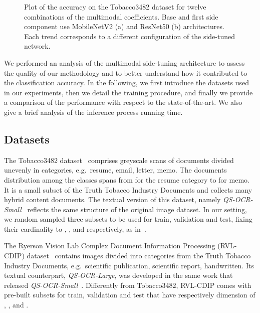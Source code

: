 

\begin{figure*}[ht]\centering
{}\qquad
{}
\caption{Plot of the accuracy on the Tobacco3482 dataset for twelve combinations of the multimodal coefficients. Base and first side component use MobileNetV2 (a) and ResNet50 (b) architectures. Each trend corresponds to a different configuration of the side-tuned network.}\label{fig:exp_coefficients}\end{figure*}



We performed an analysis of the multimodal side-tuning architecture to assess the quality of our methodology and to better understand how it contributed to the classification accuracy.
In the following, we first introduce the datasets used in our experiments, then we detail the training procedure, and finally we provide a comparison of the performance with respect to the state-of-the-art.
We also give a brief analysis of the inference process running time.

\subsection{Datasets}
The Tobacco3482 dataset~\cite{KUMAR2014119} comprises  greyscale scans of documents divided unevenly in  categories, e.g.\ resume, email, letter, memo.
The documents distribution among the classes spans from  for the resume category to  for memo.
It is a small subset of the Truth Tobacco Industry Documents and collects many hybrid content documents.
The textual version of this dataset, namely \textit{QS-OCR-Small}~\cite{audebert} reflects the same structure of the original image dataset. 
In our setting, we random sampled three subsets to be used for train, validation and test, fixing their cardinality to , , and  respectively, as in~\cite{7333910,audebert}.

The Ryerson Vision Lab Complex Document Information Processing (RVL-CDIP) dataset~\cite{7333910} contains  images divided into  categories from the Truth Tobacco Industry Documents, e.g.\ scientific publication, scientific report, handwritten. 
Its textual counterpart, \textit{QS-OCR-Large}, was developed in the same work that released \textit{QS-OCR-Small}~\cite{audebert}.
Differently from Tobacco3482, RVL-CDIP comes with pre-built subsets for train, validation and test that have respectively dimension of , , and .


